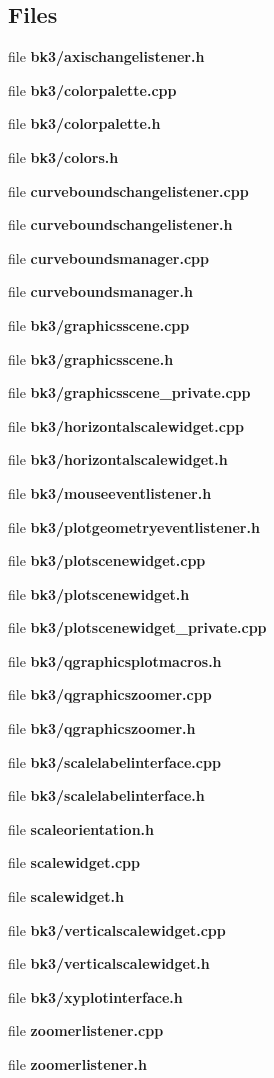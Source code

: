 \subsection*{Files}
\begin{DoxyCompactItemize}
\item 
file {\bf bk3/axischangelistener.\+h}
\item 
file {\bf bk3/colorpalette.\+cpp}
\item 
file {\bf bk3/colorpalette.\+h}
\item 
file {\bf bk3/colors.\+h}
\item 
file {\bf curveboundschangelistener.\+cpp}
\item 
file {\bf curveboundschangelistener.\+h}
\item 
file {\bf curveboundsmanager.\+cpp}
\item 
file {\bf curveboundsmanager.\+h}
\item 
file {\bf bk3/graphicsscene.\+cpp}
\item 
file {\bf bk3/graphicsscene.\+h}
\item 
file {\bf bk3/graphicsscene\+\_\+private.\+cpp}
\item 
file {\bf bk3/horizontalscalewidget.\+cpp}
\item 
file {\bf bk3/horizontalscalewidget.\+h}
\item 
file {\bf bk3/mouseeventlistener.\+h}
\item 
file {\bf bk3/plotgeometryeventlistener.\+h}
\item 
file {\bf bk3/plotscenewidget.\+cpp}
\item 
file {\bf bk3/plotscenewidget.\+h}
\item 
file {\bf bk3/plotscenewidget\+\_\+private.\+cpp}
\item 
file {\bf bk3/qgraphicsplotmacros.\+h}
\item 
file {\bf bk3/qgraphicszoomer.\+cpp}
\item 
file {\bf bk3/qgraphicszoomer.\+h}
\item 
file {\bf bk3/scalelabelinterface.\+cpp}
\item 
file {\bf bk3/scalelabelinterface.\+h}
\item 
file {\bf scaleorientation.\+h}
\item 
file {\bf scalewidget.\+cpp}
\item 
file {\bf scalewidget.\+h}
\item 
file {\bf bk3/verticalscalewidget.\+cpp}
\item 
file {\bf bk3/verticalscalewidget.\+h}
\item 
file {\bf bk3/xyplotinterface.\+h}
\item 
file {\bf zoomerlistener.\+cpp}
\item 
file {\bf zoomerlistener.\+h}
\end{DoxyCompactItemize}
